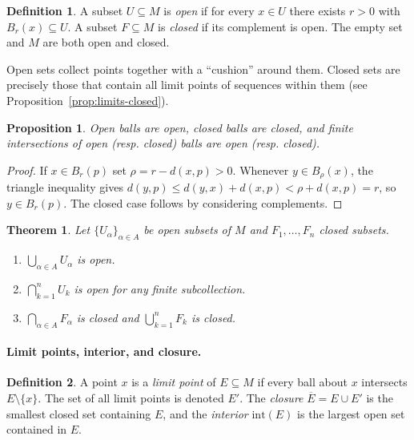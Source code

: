 \documentclass{article}
\theoremstyle{definition}
\newtheorem{definition}{Definition}[section]
\theoremstyle{plain}
\newtheorem{theorem}{Theorem}[section]
\newtheorem{proposition}{Proposition}[section]
\begin{document}
\begin{definition}\label{def:open-closed}
	A subset $U\subseteq M$ is \emph{open} if for every $x\in U$ there exists $r>0$ with $B_r(x)\subseteq U$. A subset $F\subseteq M$ is \emph{closed} if its complement is open. The empty set and $M$ are both open and closed.
\end{definition}

Open sets collect points together with a ``cushion'' around them. Closed sets are precisely those that contain all limit points of sequences within them (see Proposition~\ref{prop:limits-closed}).

\begin{proposition}\label{prop:balls-open-closed}
Open balls are open, closed balls are closed, and finite intersections of open (resp. closed) balls are open (resp. closed).
\end{proposition}
\begin{proof}
If $x\in B_r(p)$ set $\rho=r-d(x,p)>0$. Whenever $y\in B_\rho(x)$, the triangle inequality gives $d(y,p)\le d(y,x)+d(x,p)<\rho+d(x,p)=r$, so $y\in B_r(p)$. The closed case follows by considering complements.
\end{proof}

\begin{theorem}\label{thm:open-set-properties}
Let $\{U_\alpha\}_{\alpha\in A}$ be open subsets of $M$ and $F_1,\dots,F_n$ closed subsets.
\begin{enumerate}
	\item $\bigcup_{\alpha\in A} U_\alpha$ is open.
	\item $\bigcap_{k=1}^n U_k$ is open for any finite subcollection.
	\item $\bigcap_{\alpha\in A} F_\alpha$ is closed and $\bigcup_{k=1}^n F_k$ is closed.
\end{enumerate}
\end{theorem}

\paragraph{Limit points, interior, and closure.}
\begin{definition}\label{def:limit-point}
	A point $x$ is a \emph{limit point} of $E\subseteq M$ if every ball about $x$ intersects $E\setminus\{x\}$. The set of all limit points is denoted $E'$. The \emph{closure} $\overline{E}=E\cup E'$ is the smallest closed set containing $E$, and the \emph{interior} $\mathrm{int}(E)$ is the largest open set contained in $E$.
\end{definition}
\end{document}
